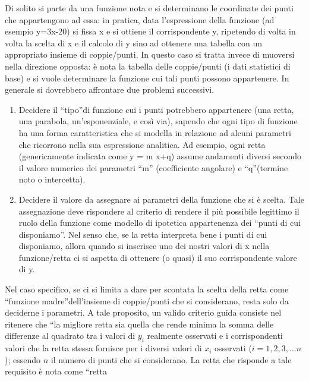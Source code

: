  Di solito si parte da una funzione nota e si determinano le coordinate dei 
punti che appartengono ad essa: in pratica, data l'espressione della 
funzione (ad esempio y=3x-20) si fissa x e si ottiene il corrispondente y, 
ripetendo di volta in volta la  scelta di x e il calcolo di y  sino ad 
ottenere una tabella con un  appropriato insieme di coppie/punti. 
 In questo caso si tratta invece di muoversi nella direzione opposta: è 
nota la tabella delle coppie/punti (i dati statistici di base) e si vuole 
determinare la funzione cui tali punti possono appartenere.
 In generale si dovrebbero affrontare due problemi successivi. 
 \begin{enumerate}
        \item Decidere il \textquotedblleft tipo\textquotedblright di 
funzione cui i punti potrebbero appartenere (una retta, una parabola, 
un'esponenziale, e così via), sapendo che ogni tipo di funzione ha una 
forma caratteristica che si modella in relazione ad alcuni parametri che 
ricorrono nella sua espressione analitica. Ad esempio, ogni retta 
(genericamente indicata come y = m x+q) assume andamenti diversi secondo il 
valore numerico dei parametri \textquotedblleft m\textquotedblright 
(coefficiente angolare) e \textquotedblleft q\textquotedblright (termine 
noto o intercetta).
        \item Decidere  il valore da assegnare ai parametri della funzione 
che si è scelta. Tale assegnazione deve rispondere al criterio di rendere 
il più possibile legittimo il ruolo della funzione come modello di 
ipotetica appartenenza dei \textquotedblleft punti di cui 
disponiamo\textquotedblright. Nel senso che, se la retta interpreta bene i 
punti di cui disponiamo, allora quando si inserisce uno dei nostri valori 
di x nella funzione/retta ci si aspetta di ottenere (o quasi) il suo 
corrispondente valore di y.
 \end{enumerate}
 Nel caso specifico, se ci si limita a dare per scontata la scelta della 
retta come \textquotedblleft funzione madre\textquotedblright dell'insieme 
di coppie/punti che si considerano, resta solo da deciderne i parametri. A 
tale proposito, un valido criterio guida consiste nel ritenere che 
\textquotedblleft la migliore retta sia quella che rende minima la somma 
delle differenze al quadrato tra i valori di \(y_i\) realmente osservati e i 
corrispondenti valori che la retta stessa fornisce per i diversi valori di 
\(x_i\) osservati (\(i=1,2,3,\dots n\)); essendo \(n\) il numero di punti che si 
considerano.
 La retta che risponde a tale requisito è nota come \textquotedblleft retta 
